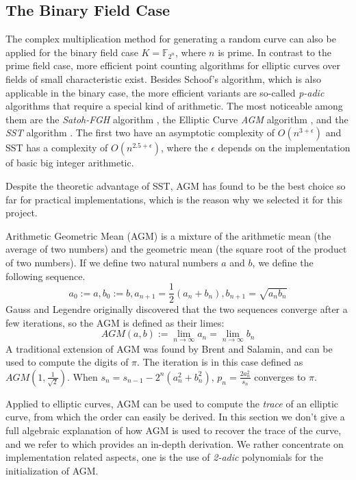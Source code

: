\documentclass[11pt,english]{article}
\begin{document}
\subsection{The Binary Field Case}
The complex multiplication method for generating a random curve can also be applied for the binary field case $K=\mathbb{F}_{2^n}$, where $n$ is prime.
In contrast to the prime field case, more efficient point counting algorithms for elliptic curves over fields of small characteristic exist.
Besides Schoof's algorithm, which is also applicable in the binary case, the more efficient variants are so-called \emph{p-adic} algorithms that require a special kind of arithmetic.
The most noticeable among them are the \emph{Satoh-FGH} algorithm \cite{satohfgh}, the Elliptic Curve \emph{AGM} algorithm \cite{717152}\cite{handbook}, and the \emph{SST} algorithm \cite{Satoh200389}.
The first two have an asymptotic complexity of $O(n^{3+\epsilon})$ and SST has a complexity of $O(n^{2.5+\epsilon})$, where the $\epsilon$ depends on the implementation of basic big integer arithmetic.

Despite the theoretic advantage of SST, AGM has found to be the best choice so far for practical implementations, which is the reason why we selected it for this project.

Arithmetic Geometric Mean (AGM) is a mixture of the arithmetic mean (the average of two numbers) and the geometric mean (the square root of the product of two numbers). If we define two natural numbers $a$ and $b$, we define the following sequence.
\begin{displaymath}
 a_0:=a,b_0:=b,a_{n+1}=\frac{1}{2}(a_n+b_n),b_{n+1}=\sqrt{a_nb_n}
\end{displaymath}
Gauss and Legendre originally discovered that the two sequences converge after a few iterations, so the AGM is defined as their limes:
\begin{displaymath}
 AGM(a,b):=\lim_{n\rightarrow \infty} a_n=\lim_{n\rightarrow \infty} b_n
\end{displaymath}
A traditional extension of AGM was found by Brent and Salamin, and can be used to compute the digits of $\pi$. The iteration is in this case defined as $AGM(1,\frac{1}{\sqrt{2}})$. When $s_n=s_{n-1}-2^n(a_n^2+b_n^2)$, $p_n=\frac{2a_n^2}{s_n}$ converges to $\pi$.

Applied to elliptic curves, AGM can be used to compute the \emph{trace} of an elliptic curve, from which the order can easily be derived. In this section we don't give a full algebraic explanation of how AGM is used to recover the trace of the curve, and we refer to \cite{handbook} which provides an in-depth derivation. We rather concentrate on implementation related aspects, one is the use of \emph{2-adic} polynomials for the initialization of AGM.
\end{document}
